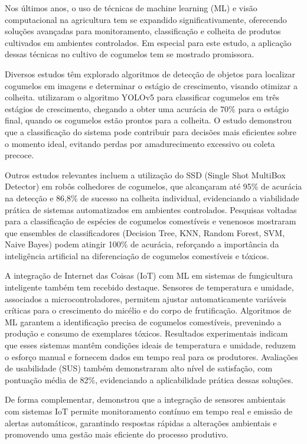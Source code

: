 Nos últimos anos, o uso de técnicas de machine learning (ML) e visão computacional na agricultura tem se expandido significativamente, oferecendo soluções avançadas para monitoramento, classificação e colheita de produtos cultivados em ambientes controlados. Em especial para este estudo, a aplicação dessas técnicas no cultivo de cogumelos tem se mostrado promissora. 

Diversos estudos têm explorado algoritmos de detecção de objetos para localizar cogumelos em imagens e determinar o estágio de crescimento, visando otimizar a colheita.\cite{Moysiadis2023} utilizaram o algoritmo YOLOv5 para classificar cogumelos em três estágios de crescimento, chegando a obter uma acurácia de 70\% para o estágio final, quando os cogumelos estão prontos para a colheita. O estudo demonstrou que a classificação do sistema pode contribuir para decisões mais eficientes sobre o momento ideal, evitando perdas por amadurecimento excessivo ou coleta precoce. 

Outros estudos relevantes incluem a utilização do SSD (Single Shot MultiBox Detector) em robôs colhedores de cogumelos, que alcançaram até 95\% de acurácia na detecção e 86,8\% de sucesso na colheita individual, evidenciando a viabilidade prática de sistemas automatizados em ambientes controlados. Pesquisas voltadas para a classificação de espécies de cogumelos comestíveis e venenosos mostraram que ensembles de classificadores (Decision Tree, KNN, Random Forest, SVM, Naive Bayes) podem atingir 100\% de acurácia, reforçando a importância da inteligência artificial na diferenciação de cogumelos comestíveis e tóxicos. 

A integração de Internet das Coisas (IoT) com ML em sistemas de fungicultura inteligente também tem recebido destaque. Sensores de temperatura e umidade, associados a microcontroladores, permitem ajustar automaticamente variáveis críticas para o crescimento do micélio e do corpo de frutificação. Algoritmos de ML garantem a identificação precisa de cogumelos comestíveis, prevenindo a produção e consumo de exemplares tóxicos. Resultados experimentais indicam que esses sistemas mantêm condições ideais de temperatura e umidade, reduzem o esforço manual e fornecem dados em tempo real para os produtores. Avaliações de usabilidade (SUS) também demonstraram alto nível de satisfação, com pontuação média de 82\%, evidenciando a aplicabilidade prática dessas soluções. 

De forma complementar, \cite{Rahman2021} demonstrou que a integração de sensores ambientais com sistemas IoT permite monitoramento contínuo em tempo real e emissão de alertas automáticos, garantindo respostas rápidas a alterações ambientais e promovendo uma gestão mais eficiente do processo produtivo.  


